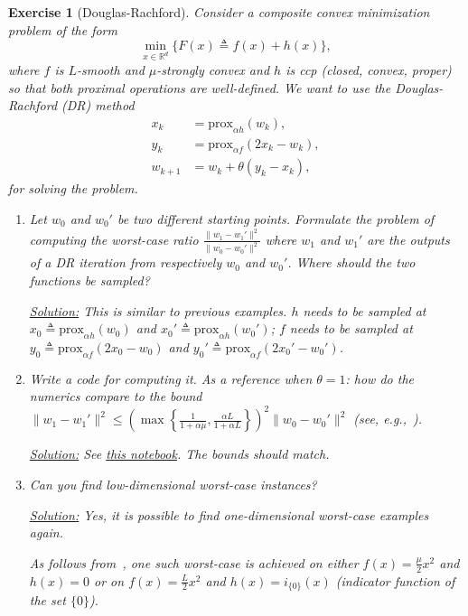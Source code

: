 \documentclass[11pt,a4paper]{article}
\newcommand{\correction}[1]{{{\color{blue}\underline{Solution:} #1}}}
\newcommand{\correction}[1]{}
\newtheorem{exercise}{Exercise}
\begin{document}
\begin{exercise}[Douglas-Rachford]\label{ex:drs} Consider a composite convex minimization problem of the form
	\[ \min_{x\in\mathbb{R}^d} \{F(x)\triangleq f(x)+h(x)\},\]
where $f$ is $L$-smooth and $\mu$-strongly convex and $h$ is ccp (closed, convex, proper) so that both proximal operations are well-defined. We want to use the Douglas-Rachford (DR) method
\begin{equation*}
\begin{aligned}
x_k & = \mathrm{prox}_{\alpha h}(w_k), \\
y_k & =  \mathrm{prox}_{\alpha f}(2x_k - w_k),\\
w_{k+1} & =  w_k + \theta (y_k - x_k),
\end{aligned}
\end{equation*}
for solving the problem.
	\begin{enumerate}
	\item Let $w_0$ and $w_0'$ be two different starting points. Formulate the problem of computing the worst-case ratio $\frac{\|w_1-w_1'\|^2}{\|w_0-w_0'\|^2}$ where $w_1$ and $w_1'$ are the outputs of a DR iteration from respectively $w_0$ and $w_0'$. Where should the two functions be sampled?
	
	\correction{This is similar to previous examples. $h$ needs to be sampled at $x_0\triangleq\mathrm{prox}_{\alpha h}(w_0)$ and $x_0'\triangleq\mathrm{prox}_{\alpha h}(w_0')$; $f$ needs to be sampled at $y_0\triangleq\mathrm{prox}_{\alpha f}(2x_0 - w_0)$ and $y_0'\triangleq\mathrm{prox}_{\alpha f}(2x_0' - w_0')$.}
	
	\item Write a code for computing it. As a reference when $\theta=1$: how do the numerics compare to the bound $\|w_1-w_1'\|^2\leqslant \left(\max\left\{\frac{1}{1+\alpha \mu},\frac{\alpha L}{1+\alpha L} \right\}\right)^2\|w_0-w_0'\|^2$ (see, e.g.,~\cite[Theorem 2]{giselsson2016linear}).
	
	\correction{See \href{https://github.com/PerformanceEstimation/Learning-Performance-Estimation/tree/main/Codes/Jupyter/Exercise10.ipynb}{this notebook}. The bounds should match.}
	
	\item Can you find low-dimensional worst-case instances?
	
	\correction{Yes, it is possible to find one-dimensional worst-case examples again.
	
	As follows from~\cite[Section 3.2]{giselsson2016linear}, one such worst-case is achieved on either $f(x)=\tfrac{\mu}{2}x^2$ and $h(x)=0$ or on $f(x)=\tfrac{L}{2}x^2$ and $h(x)=i_{\{0\}}(x)$ (indicator function of the set $\{0\}$).}
	\end{enumerate}
	\end{exercise}
\end{document}
